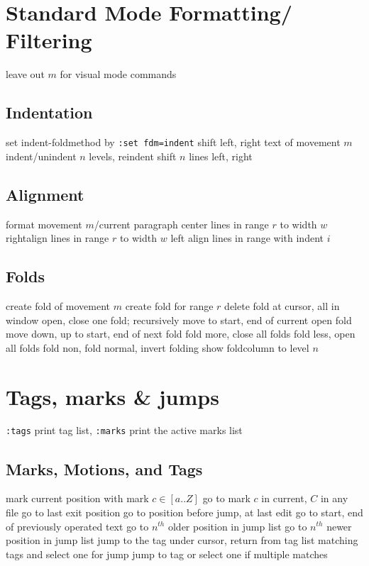 \section{Standard Mode Formatting/ Filtering}	{leave out $m$ for visual mode commands}

\subsection{Indentation}{set indent-foldmethod by {\tt :set fdm=indent}}
	{shift left, right text of movement $m$}
	{indent/unindent $n$ levels, reindent}
	{shift $n$ lines left, right}

\subsection{Alignment}{}
	{format movement $m$/current paragraph}
	{center lines in range $r$ to width $w$}
	{rightalign lines in range $r$ to width $w$}
	{left align lines in range with indent $i$}

\subsection{Folds}	{}
	{create fold of movement $m$}
	{create fold for range $r$}
	{delete fold at cursor, all in window}
	{open, close one fold; recursively}
	{move to start, end of current open fold}
	{move down, up to start, end of next fold}
	{fold more, close all folds}
	{fold less, open all folds}
	{fold non, fold normal, invert folding}
	{show foldcolumn to level $n$}

\section{Tags, marks \& jumps}{{\tt :tags} print tag list, {\tt :marks} print the active marks list}
\subsection{Marks, Motions, and Tags}	{}
	{mark current position with mark $c\in[a..Z]$}
	{go to mark $c$ in current, $C$ in any file}
	{go to last exit position}
	{go to position before jump, at last edit}
	{go to start, end of previously operated text}
	{go to $n^{th}$ older position in jump list}
	{go to $n^{th}$ newer position in jump list}
\cmdS{\ctrl ] \ctrl T }	{jump to the tag under cursor, return from tag}
	{list matching tags and select one for jump}
	{jump to tag or select one if multiple matches}

